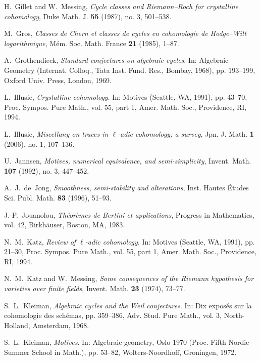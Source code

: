 \documentclass[11pt]{amsart}
\theoremstyle{definition}
\begin{document}
\begin{thebibliography}{10000000}
H.~Gillet and W.~Messing, \emph{Cycle classes and
  {R}iemann--{R}och for crystalline cohomology},
Duke Math. J. {\bf 55} (1987), no. 3, 501--538.

M.~Gros, \emph{Classes de {C}hern et classes de cycles en
cohomologie de {H}odge--{W}itt
  logarithmique},
M\'{e}m. Soc. Math. France \textbf{21} (1985), 1--87.

A.~Grothendieck, \emph{Standard conjectures on algebraic cycles}.
In: Algebraic {G}eometry ({I}nternat. {C}olloq., {T}ata {I}nst.
{F}und.
  {R}es., {B}ombay, 1968), pp. 193--199, Oxford Univ. Press, London, 1969.

L.~Illusie, \emph{Crystalline cohomology}. In: Motives ({S}eattle,
{WA}, 1991), pp. 43--70, Proc. Sympos. Pure Math., vol. 55, part 1,
Amer. Math. Soc.,
  Providence, RI, 1994.

L.~Illusie, \emph{Miscellany on traces in {$\ell$}-adic cohomology:
a survey}, Jpn. J. Math. {\bf 1} (2006), no. 1, 107--136.

U.~Jannsen, \emph{Motives, numerical equivalence, and
semi-simplicity}, Invent. Math. {\bf 107} (1992), no. 3, 447--452.

A.~J.~de~Jong, \emph{Smoothness, semi-stability and alterations},
Inst. Hautes \'Etudes Sci. Publ. Math. {\bf 83} (1996), 51--93.

J.-P.~Jouanolou, \emph{Th\'eor\`emes de {B}ertini et applications},
Progress in Mathematics, vol. 42, Birkh\"auser, Boston, MA, 1983.

N.~M.~Katz, \emph{Review of {$\ell$}-adic cohomology}. In: Motives
({S}eattle, {WA}, 1991), pp. 21--30, Proc. Sympos. Pure Math., vol.
55, part 1, Amer. Math. Soc.,
  Providence, RI, 1994.

N.~M.~Katz and W.~Messing, \emph{Some consequences of the
  {R}iemann hypothesis for varieties over finite fields},
Invent. Math. {\bf 23} (1974), 73--77.

S.~L.~Kleiman, \emph{Algebraic cycles and the {W}eil conjectures}.
In: Dix expos\'es sur la cohomologie des sch\'emas, pp. 359--386,
Adv. Stud. Pure Math., vol. 3, North-Holland, Amsterdam, 1968.

S.~L.~Kleiman, \emph{Motives}. In: Algebraic geometry, {O}slo 1970
({P}roc. {F}ifth {N}ordic {S}ummer
  {S}chool in {M}ath.), pp. 53--82, Wolters-Noordhoff, Groningen, 1972.


\end{thebibliography}
\end{document}
